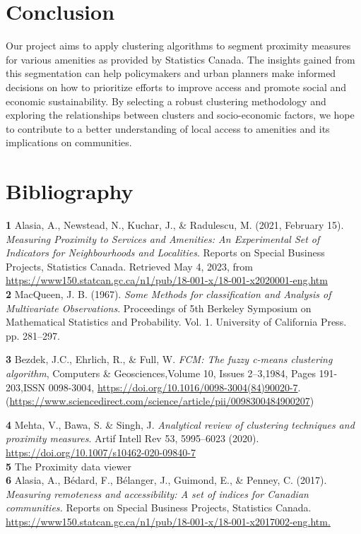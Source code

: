 \documentclass[11pt, a4paper]{article}
\begin{document}
\section*{Conclusion}


Our project aims to apply clustering algorithms to segment proximity measures for various amenities as provided by Statistics Canada. The insights gained from this segmentation can help policymakers and urban planners make informed decisions on how to prioritize efforts to improve access and promote social and economic sustainability. By selecting a robust clustering methodology and exploring the relationships between clusters and socio-economic factors, we hope to contribute to a better understanding of local access to amenities and its implications on communities. 






\section*{Bibliography}


\noindent\textbf{1} Alasia, A., Newstead, N., Kuchar, J., \& Radulescu, M. (2021, February 15). \textit{Measuring Proximity to Services and Amenities: An Experimental Set of Indicators for Neighbourhoods and Localities}. Reports on Special Business Projects, Statistics Canada. Retrieved May 4, 2023, from \sloppy\url{https://www150.statcan.gc.ca/n1/pub/18-001-x/18-001-x2020001-eng.htm}  \\ 

\noindent\textbf{2} MacQueen, J. B. (1967). \textit{Some Methods for classification and Analysis of Multivariate Observations}. Proceedings of 5th Berkeley Symposium on Mathematical Statistics and Probability. Vol. 1. University of California Press. pp. 281–297. 

\noindent\textbf{3} Bezdek, J.C., Ehrlich, R., \& Full, W. \textit{FCM: The fuzzy c-means clustering algorithm}, Computers & Geosciences,Volume 10, Issues 2–3,1984, Pages 191-203,ISSN 0098-3004, \sloppy\url{https://doi.org/10.1016/0098-3004(84)90020-7}.(\sloppy\url{https://www.sciencedirect.com/science/article/pii/0098300484900207})

\noindent\textbf{4} Mehta, V., Bawa, S. \& Singh, J. \textit{Analytical review of clustering techniques and proximity measures}. Artif Intell Rev 53, 5995–6023 (2020). \sloppy\url{https://doi.org/10.1007/s10462-020-09840-7} \\ 

\noindent\textbf{5} The Proximity data viewer\\ 

\noindent\textbf{6} Alasia, A., Bédard, F., Bélanger, J., Guimond, E., \& Penney, C. (2017). \textit{Measuring remoteness and accessibility: A set of indices for Canadian communities.} Reports on Special Business Projects, Statistics Canada. \sloppy\url{https://www150.statcan.gc.ca/n1/pub/18-001-x/18-001-x2017002-eng.htm.}\\ 
\end{document}

